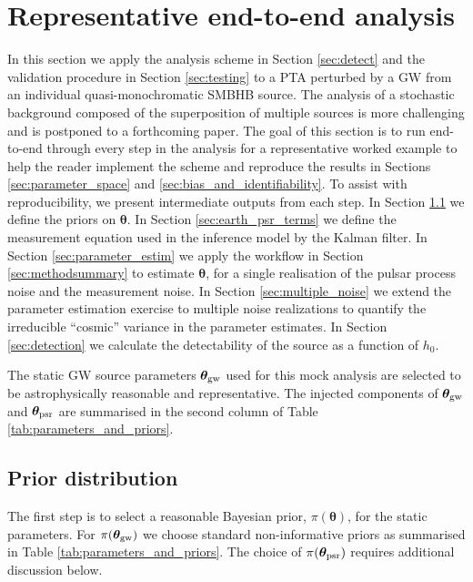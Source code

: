 \documentclass[fleqn,usenatbib,useAMS]{mnras}
\begin{document}
\section{Representative end-to-end analysis} \label{sec:rep_example}
In this section we apply the analysis scheme in Section \ref{sec:detect} and the validation procedure in Section \ref{sec:testing} to a PTA perturbed by a GW from an individual quasi-monochromatic SMBHB source. The analysis of a stochastic background composed of the superposition of multiple sources is more challenging and is postponed to a forthcoming paper. The goal of this section is to run end-to-end through every step in the analysis for a representative worked example to help the reader implement the scheme and reproduce the results in Sections \ref{sec:parameter_space} and \ref{sec:bias_and_identifiability}. To assist with reproducibility, we present intermediate outputs from each step. In Section \ref{sec:priors} we define the priors on $\boldsymbol{\theta}$. In Section \ref{sec:earth_psr_terms} we define the measurement equation used in the inference model by the Kalman filter. In Section \ref{sec:parameter_estim} we apply the workflow in Section \ref{sec:methodsummary} to estimate $\boldsymbol{\theta}$, for a single realisation of the pulsar process noise and the measurement noise. In Section \ref{sec:multiple_noise} we extend the parameter estimation exercise to multiple noise realizations to quantify the irreducible ``cosmic'' variance in the parameter estimates. In Section \ref{sec:detection} we calculate the detectability of the source as a function of $h_0$. \newline


The static GW source parameters $\boldsymbol{\theta}_{\rm gw}$ used for this mock analysis are selected to be astrophysically reasonable and representative. The injected components of $\boldsymbol{\theta}_{\rm gw}$ and $\boldsymbol{\theta}_{\rm psr}$ are summarised in the second column of Table \ref{tab:parameters_and_priors}.

\subsection{Prior distribution}\label{sec:priors}
The first step is to select a reasonable Bayesian prior, $\pi(\boldsymbol{\theta})$, for the static parameters. For $\pi(\boldsymbol{\theta}_{\rm gw})$ we choose standard non-informative priors \citep[e.g.][]{Bhagwat2021} as summarised in Table \ref{tab:parameters_and_priors}. The choice of $\pi(\boldsymbol{\theta}_{\rm psr})$ requires additional discussion below. \newline 
\end{document}
